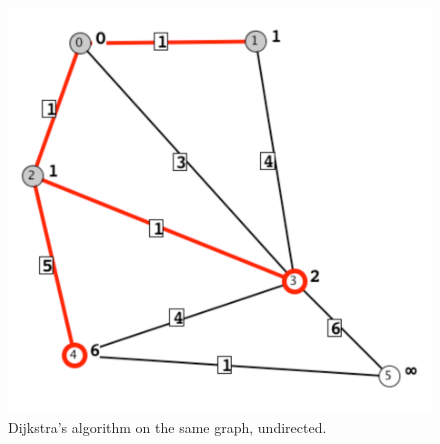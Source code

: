 \begin{figure}[p]

\begin{center}
\includegraphics[scale=0.55]{X_dijkstra_undirected}
\end{center}

\caption{Dijkstra's algorithm on the same graph, undirected.}
\label{fig:dijkstra_undirected}
\end{figure}
